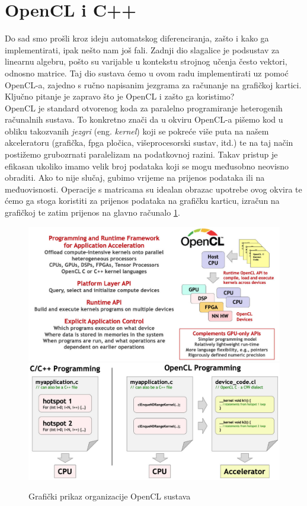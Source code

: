 \documentclass[zavrsnirad]{fer}
\begin{document}
\section{OpenCL i C++}
Do sad smo prošli kroz ideju automatskog diferenciranja, zašto i kako ga implementirati, ipak nešto nam još fali. Zadnji dio slagalice je podsustav za linearnu algebru, pošto su varijable u kontekstu strojnog učenja često vektori, odnosno matrice. Taj dio sustava ćemo u ovom radu implementirati uz pomoć OpenCL-a, zajedno s ručno napisanim jezgrama za računanje na grafičkoj kartici. Ključno pitanje je zapravo što je OpenCL i zašto ga koristimo?
\\
OpenCL je standard otvorenog koda za paralelno programiranje heterogenih računalnih sustava. To konkretno znači da u okviru OpenCL-a pišemo kod u obliku takozvanih \textit{jezgri} (eng. \textit{kernel}) koji se pokreće više puta na našem akceleratoru (grafička, fpga pločica, višeprocesorski sustav, itd.) te na taj način postižemo grubozrnati paralelizam na podatkovnoj razini. Takav pristup je efikasan ukoliko imamo velik broj podataka koji se mogu međusobno neovisno obraditi. Ako to nije slučaj, gubimo vrijeme na prijenos podataka ili na međuovisnosti. Operacije s matricama su idealan obrazac upotrebe ovog okvira te ćemo ga stoga koristiti za prijenos podataka na grafičku karticu, izračun na grafičkoj te zatim prijenos na glavno računalo \ref{slk:opencl}.
\\
\begin{figure}[h]
  \centering
  \includegraphics[width=0.6\linewidth]{./slike/opencl.jpg}
  \includegraphics[width=0.6\linewidth]{./slike/opencl_model.jpg}
  \caption{Grafički prikaz organizacije OpenCL sustava}
  \cite{opencl}
  \label{slk:opencl}
\end{figure}
\end{document}
